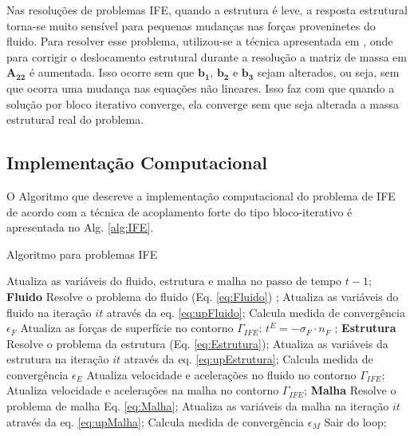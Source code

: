 \documentclass[tese_patricia]{subfiles}
\begin{document}
Nas resoluções de problemas IFE, quando a estrutura é leve, a resposta estrutural torna-se muito sensível para pequenas mudanças nas forças proveninetes do fluido. Para resolver esse problema, utilizou-se a técnica apresentada em , onde para corrigir o deslocamento estrutural durante a resolução a matriz de massa em $\mathbf{A_{22}}$ é aumentada. Isso ocorre sem que $\mathbf{b_{1}}$, $\mathbf{b_{2}}$ e $\mathbf{b_{3}}$ sejam alterados, ou seja, sem que ocorra uma mudança nas equações não lineares. Isso faz com que quando a solução por bloco iterativo converge, ela converge sem que seja alterada a massa estrutural real do problema.

\subsection{Implementação Computacional} 


O Algoritmo que descreve a implementação computacional do problema de IFE de acordo com a técnica de acoplamento forte do tipo bloco-iterativo é apresentada no Alg. \ref{alg:IFE}.

\begin{algorithm}
	\caption{Algoritmo para problemas IFE}
	\label{alg:IFE}
	\begin{algorithmic}[1]
		\State Atualiza as variáveis do fluido, estrutura e malha no passo de tempo $t-1$;
		\State \textbf{Fluido}
		\State Resolve o problema do fluido (Eq. \eqref{eq:Fluido}) ;
		\State Atualiza as variáveis do fluido na iteração $it$ através da eq. \ref{eq:upFluido};
		\State Calcula medida de convergência $\epsilon_F$
		\State Atualiza as forças de superfície no contorno  $\Gamma_{IFE}$: $t^{E} = -\sigma_{F} \cdot n_{F}$ ;
		\State \textbf{Estrutura}
		\State Resolve o problema da estrutura (Eq. \eqref{eq:Estrutura});
		\State Atualiza as variáveis da estrutura na iteração $it$ através da eq. \eqref{eq:upEstrutura};
		\State Calcula medida de convergência $\epsilon_E$
		\State Atualiza velocidade e acelerações no fluido no contorno  $\Gamma_{IFE}$;
		\State Atualiza velocidade e acelerações na malha no contorno  $\Gamma_{IFE}$;
		\State \textbf{Malha}
		\State Resolve o problema de malha Eq. \eqref{eq:Malha};
		\State Atualiza as variáveis da malha na iteração $it$ através da eq. \eqref{eq:upMalha};
		\State Calcula medida de convergência $\epsilon_M$
		\State Sair do loop;
		\EndIf
		\EndFor
		\EndFor
	\end{algorithmic}
\end{algorithm}
\end{document}
